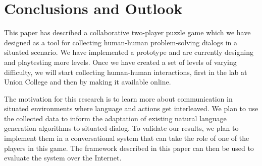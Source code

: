
\section{Conclusions and Outlook}

This paper has described a collaborative two-player puzzle game which
we have designed as a tool for collecting human-human problem-solving
dialogs in a situated scenario. We have implemented a prototype and
are currently designing and playtesting more levels. Once we have
created a set of levels of varying difficulty, we will start
collecting human-human interactions, first in the lab at Union College
and then by making it available online.

The motivation for this research is to learn more about communication
in situated environments where language and actions get interleaved.
We plan to use the collected data to inform the adaptation of existing
natural language generation algorithms to situated dialog.  To
validate our results, we plan to implement them in a conversational
system that can take the role of one of the players in this game. The
framework described in this paper can then be used to evaluate the
system over the Internet.
